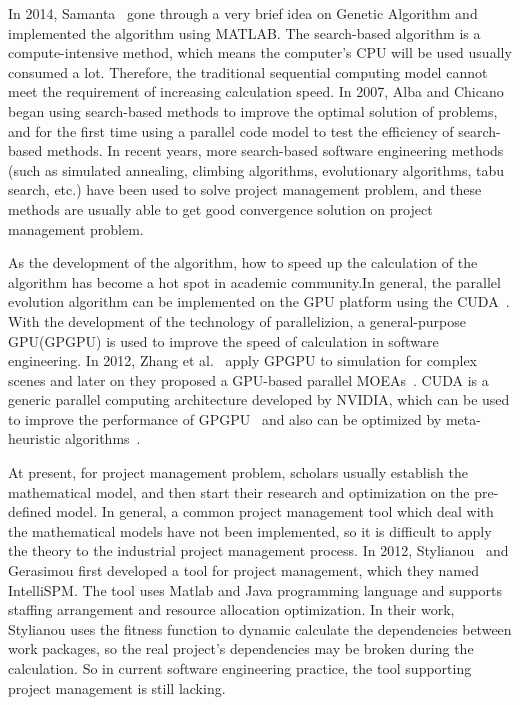 In 2014, Samanta~\cite{samanta} gone through a very brief idea on Genetic Algorithm and implemented the algorithm using MATLAB.
The search-based algorithm is a compute-intensive method, which means the
computer's CPU will be used usually consumed a lot. Therefore, the traditional
sequential computing model cannot meet the requirement of increasing calculation
speed. In 2007, Alba and Chicano~\cite{pospichal} began using search-based methods to improve the
optimal solution of problems, and for the first time using a parallel code model
to test the efficiency of search-based methods. In recent
years, more search-based software engineering methods (such as simulated
annealing, climbing algorithms, evolutionary algorithms, tabu search, etc.) have
been used to solve project management problem, and these methods are usually
able to get good convergence solution on project management problem.

As the development of the algorithm, how to speed up the calculation of the algorithm
has become a hot spot in academic community.In general, the parallel evolution algorithm can be implemented on the GPU platform using the CUDA~\cite{vidal}. With the development of the technology of parallelizion, a general-purpose GPU(GPGPU) is used 
to improve the speed of calculation in software engineering. In 2012, Zhang et al.~\cite{zhang} apply GPGPU to
simulation for complex scenes and later on they proposed a GPU-based parallel MOEAs~\cite{li}.
CUDA is a generic parallel computing architecture developed by NVIDIA, which can be used to improve the performance of GPGPU~\cite{langdon2} and also can be optimized by meta-heuristic algorithms~\cite{langdon1}.


At present, for project management problem, scholars usually establish the
mathematical model, and then start their research and optimization on the
pre-defined model. In general, a common project management tool which deal with
the mathematical models have not been implemented, so it is difficult to apply
the theory to the industrial project management process. In 2012, Stylianou~\cite{stylianou} and
Gerasimou first developed a tool for project management, which they named
IntelliSPM. The tool uses Matlab and Java programming language and 
supports staffing arrangement and resource allocation optimization. In
their work, Stylianou uses the fitness function to dynamic calculate the
dependencies between work packages, so the real project's dependencies may be
broken during the calculation. So in current software engineering practice, the
tool supporting project management is still lacking.

